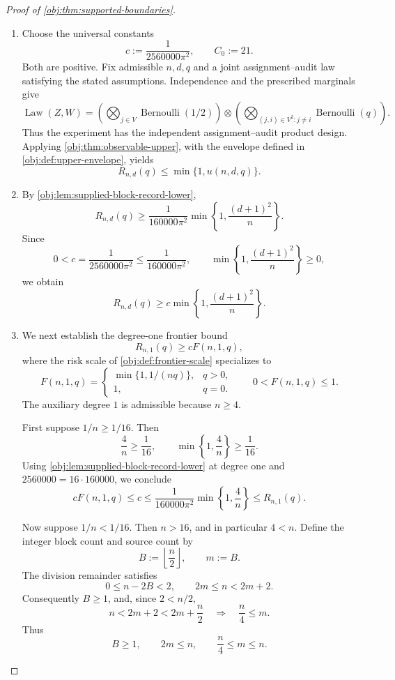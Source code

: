 \documentclass[11pt]{article}
\begin{document}
\begin{proof}[Proof of \cref{obj:thm:supported-boundaries}]
\begin{enumerate}
\item Choose the universal constants
\[
c:=\frac{1}{2560000\pi^2},
\qquad
C_0:=21.
\]
Both are positive. Fix admissible \(n,d,q\) and a joint assignment--audit law satisfying the stated assumptions. Independence and the prescribed marginals give
\[
\operatorname{Law}(Z,W)
=
\left(\bigotimes_{j\in V}\operatorname{Bernoulli}(1/2)\right)
\otimes
\left(\bigotimes_{(j,i)\in V^2:j\ne i}
\operatorname{Bernoulli}(q)\right).
\]
Thus the experiment has the independent assignment--audit product design. %
Applying \cref{obj:thm:observable-upper}, with the envelope defined in \cref{obj:def:upper-envelope}, yields
\[
R_{n,d}(q)\le \min\{1,u(n,d,q)\}.
\]

\item By \cref{obj:lem:supplied-block-record-lower},
\[
R_{n,d}(q)\ge
\frac{1}{160000\pi^2}
\min\left\{1,\frac{(d+1)^2}{n}\right\}.
\]
Since
\[
0<c=\frac{1}{2560000\pi^2}
\le \frac{1}{160000\pi^2},
\qquad
\min\left\{1,\frac{(d+1)^2}{n}\right\}\ge0,
\]
we obtain
\[
R_{n,d}(q)\ge
c\min\left\{1,\frac{(d+1)^2}{n}\right\}.
\]

\item We next establish the degree-one frontier bound
\[
R_{n,1}(q)\ge cF(n,1,q),
\]
where the risk scale of \cref{obj:def:frontier-scale} specializes to
\[
F(n,1,q)=
\begin{cases}
\min\{1,1/(nq)\},&q>0,\\
1,&q=0.
\end{cases}
\qquad
0<F(n,1,q)\le1.
\]
The auxiliary degree \(1\) is admissible because \(n\ge4\).

First suppose \(1/n\ge1/16\). Then
\[
\frac4n\ge\frac1{16},
\qquad
\min\left\{1,\frac4n\right\}\ge\frac1{16}.
\]
Using \cref{obj:lem:supplied-block-record-lower} at degree one and
\(2560000=16\cdot160000\), we conclude
\[
cF(n,1,q)
\le c
\le
\frac{1}{160000\pi^2}\min\left\{1,\frac4n\right\}
\le R_{n,1}(q).
\]

Now suppose \(1/n<1/16\). Then \(n>16\), and in particular \(4<n\). Define the integer block count and source count by
\[
B:=\left\lfloor\frac n2\right\rfloor,
\qquad
m:=B.
\]
The division remainder satisfies
\[
0\le n-2B<2,
\qquad
2m\le n<2m+2.
\]
Consequently \(B\ge1\), and, since \(2<n/2\),
\[
n<2m+2<2m+\frac n2
\quad\Longrightarrow\quad
\frac n4\le m.
\]
Thus
\[
B\ge1,\qquad 2m\le n,\qquad \frac n4\le m\le n.
\]


\end{enumerate}
\end{proof}
\end{document}
